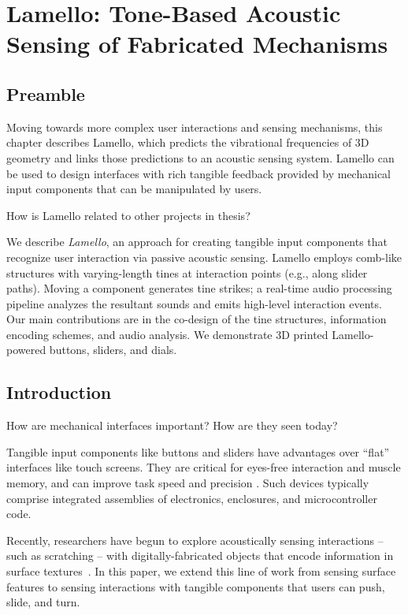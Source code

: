 \chapter{Lamello: Tone-Based Acoustic Sensing of Fabricated Mechanisms}

\section{Preamble}
Moving towards more complex user interactions and sensing mechanisms, this chapter describes Lamello, which predicts the vibrational frequencies of 3D geometry and links those predictions to an acoustic sensing system. Lamello can be used to design interfaces with rich tangible feedback provided by mechanical input components that can be manipulated by users.

How is Lamello related to other projects in thesis?

We describe \emph{Lamello}, an approach for creating tangible input components that recognize user interaction via passive acoustic sensing. Lamello employs comb-like structures with varying-length tines at interaction points (e.g., along slider paths). Moving a component generates tine strikes; a real-time audio processing pipeline analyzes the resultant sounds and emits high-level interaction events. Our main contributions are in the co-design of the tine structures, information encoding schemes, and audio analysis. We demonstrate 3D printed Lamello-powered buttons, sliders, and dials. 

\section{Introduction}
How are mechanical interfaces important?  How are they seen today?

Tangible input components like buttons and sliders
have advantages over ``flat'' interfaces like touch screens. They are critical for eyes-free interaction and muscle memory, and can improve task speed and precision \cite{Klemmer-bodies}.  Such devices typically comprise integrated assemblies of electronics, enclosures, and microcontroller code.

Recently, researchers have begun to explore acoustically sensing interactions -- such as scratching -- with digitally-fabricated objects that encode information in surface textures~\cite{Harrison-acousticbarcodes,Murray-Smith-stane}. In this paper, we extend this line of work from sensing surface features to sensing interactions with tangible components that users can push, slide, and turn.

